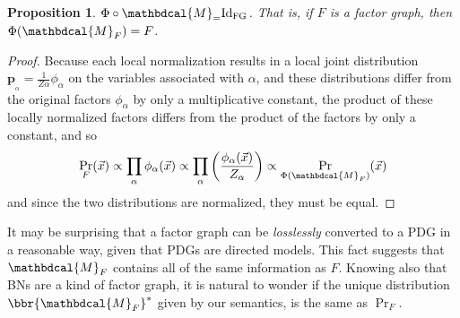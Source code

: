 \documentclass{article}
\theoremstyle{plain}
\newtheorem{prop}[theorem]{Proposition}
\theoremstyle{definition}
\theoremstyle{remark}
\newcommand\mat[1]{\mathbf{#1}}
\newcommand{\bp}[1][L]{\mat{p}_{\!_{#1}\!}}
\newcommand{\dg}[1]{\mathbdcal{#1}}
\newcommand{\PDGof}[1]{{\dg M}_{#1}}
\numberwithin{equation}{section}
\begin{document}
{\begin{prop}\label{prop:fg-pdg-lossless}
	$\Phi \circ \PDGof = \mathrm{Id}_{\text{FG}}$. That is, if $F$ is a factor graph, then $\Phi(\PDGof{F}) = F$.
\end{prop}
\begin{proof}
	Because each local normalization results in a local joint
			distribution $\bp[\alpha] = \frac{1}{Z\alpha}
			\phi_\alpha$ on the variables associated with $\alpha$, and these distributions differ from the original factors $\phi_\alpha$ by only a multiplicative 
		   constant, the product of these locally normalized factors differs from the product of the factors by only a constant, and so 
	\[ \Pr_F(\vec x) \propto \prod_\alpha \phi_\alpha(\vec x) \propto \prod_\alpha \left(\frac{\phi_\alpha(\vec x)}{Z_\alpha}\right) \propto \Pr_{\Phi(\PDGof{F})}(\vec x) \]
	and since the two distributions are normalized, they must be equal.
\end{proof}


It may be surprising that a factor graph can be \emph{losslessly} converted to a PDG in a reasonable way, given that PDGs are directed models.
This fact suggests that $\PDGof{F}$ contains all of the same information as $F$. Knowing also that BNs are a kind of factor graph, it is natural to wonder if the unique distribution $\bbr{\PDGof{F}}^*$ given by our semantics, is the same as $\Pr_F$.		


	
}
\end{document}
